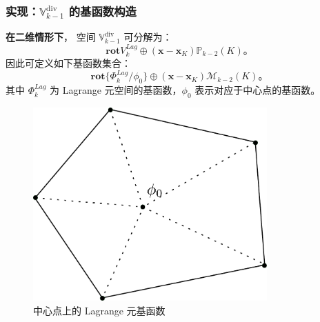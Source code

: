 \documentclass[notheorems,serif]{beamer}
\begin{document}
\begin{frame}
    \frametitle{实现：$\mathbb{V}^{\mathrm{div}}_{k-1}$ 的基函数构造}
    \begin{minipage}[b]{0.55\linewidth}
    \textbf{在二维情形下}，
    空间 $\mathbb{V}^{\mathrm{div}}_{k-1}$ 可分解为：
    $$
    \mathbf{rot} V^{Lag}_k \oplus (\mathbf{x-x}_K)\mathbb{P}_{k-2}(K)。 
    $$
    因此可定义如下基函数集合：
    $$
    \mathbf{rot} \{\Phi^{Lag}_k/\phi_0\} \oplus (\mathbf{x-x}_K)
    \mathcal{M}_{k-2}(K)。
    $$
    其中 $\Phi^{Lag}_k$ 为 Lagrange 元空间的基函数，$\phi_0$
    表示对应于中心点的基函数。
\end{minipage}
\hfill
\begin{minipage}[b]{0.4\linewidth}
    \centering
    \begin{figure}[htpb]
        \centering
        \includegraphics[width=0.8\textwidth]{../figures/lagrange_phi0.pdf}
        \caption{中心点上的 Lagrange 元基函数}
    \end{figure}
\vspace{5pt}
\end{minipage}
\end{frame}
\end{document}
